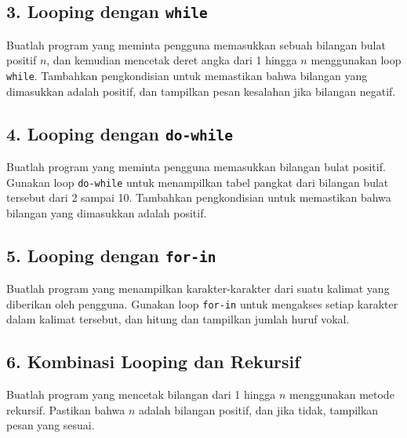 \subsection{3. Looping dengan \texttt{while}}
Buatlah program yang meminta pengguna memasukkan sebuah bilangan bulat positif \( n \), dan kemudian mencetak deret angka dari 1 hingga \( n \) menggunakan loop \texttt{while}. Tambahkan pengkondisian untuk memastikan bahwa bilangan yang dimasukkan adalah positif, dan tampilkan pesan kesalahan jika bilangan negatif.


\subsection*{4. Looping dengan \texttt{do-while}}
Buatlah program yang meminta pengguna memasukkan bilangan bulat positif. Gunakan loop \texttt{do-while} untuk menampilkan tabel pangkat dari bilangan bulat tersebut dari 2 sampai 10. Tambahkan pengkondisian untuk memastikan bahwa bilangan yang dimasukkan adalah positif.

\subsection*{5. Looping dengan \texttt{for-in}}
Buatlah program yang menampilkan karakter-karakter dari suatu kalimat yang diberikan oleh pengguna. Gunakan loop \texttt{for-in} untuk mengakses setiap karakter dalam kalimat tersebut, dan hitung dan tampilkan jumlah huruf vokal.

\subsection*{6. Kombinasi Looping dan Rekursif}
Buatlah program yang mencetak bilangan dari 1 hingga \( n \) menggunakan metode rekursif. Pastikan bahwa \( n \) adalah bilangan positif, dan jika tidak, tampilkan pesan yang sesuai.
